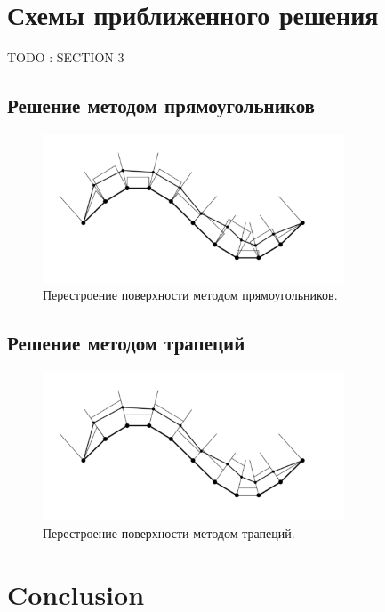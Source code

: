 \documentclass[
11pt,%
tightenlines,%
twoside,%
onecolumn,%
nofloats,%
nobibnotes,%
nofootinbib,%
superscriptaddress,%
noshowpacs,%
centertags]%
{revtex4}
\begin{document}
\section{Схемы приближенного решения}

TODO : SECTION 3

\subsection{Решение методом прямоугольников}

\begin{figure}[h]
\setcaptionmargin{5mm}
\onelinecaptionstrue
\includegraphics[width=0.8\textwidth]{pics/grid_rectangles.pdf}
\caption{Перестроение поверхности методом прямоугольников.}
\label{fig:grid_rectangles}
\end{figure}

\subsection{Решение методом трапеций}

\begin{figure}[h]
\setcaptionmargin{5mm}
\onelinecaptionstrue
\includegraphics[width=0.8\textwidth]{pics/grid_trapeziums.pdf}
\caption{Перестроение поверхности методом трапеций.}
\label{fig:grid_trapeziums}
\end{figure}

\section{Conclusion}
\end{document}
